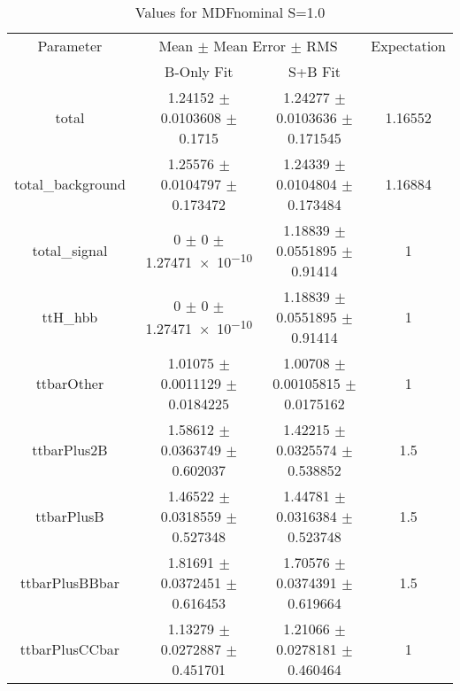 \begin{table}
\centering
\caption{Values for MDFnominal S=1.0}
\begin{tabular}{cccc}
\toprule
Parameter & \multicolumn{2}{c}{Mean $\pm$ Mean Error $\pm$ RMS} & Expectation\\
 & B-Only Fit & S+B Fit & \\
\midrule
total & \num{1.24152} $\pm$ \num{0.0103608} $\pm$ \num{0.1715} & \num{1.24277} $\pm$ \num{0.0103636} $\pm$ \num{0.171545} & \num{1.16552}\\
total\_background & \num{1.25576} $\pm$ \num{0.0104797} $\pm$ \num{0.173472} & \num{1.24339} $\pm$ \num{0.0104804} $\pm$ \num{0.173484} & \num{1.16884}\\
total\_signal & \num{0} $\pm$ \num{0} $\pm$ \num{1.27471e-10} & \num{1.18839} $\pm$ \num{0.0551895} $\pm$ \num{0.91414} & \num{1}\\
ttH\_hbb & \num{0} $\pm$ \num{0} $\pm$ \num{1.27471e-10} & \num{1.18839} $\pm$ \num{0.0551895} $\pm$ \num{0.91414} & \num{1}\\
ttbarOther & \num{1.01075} $\pm$ \num{0.0011129} $\pm$ \num{0.0184225} & \num{1.00708} $\pm$ \num{0.00105815} $\pm$ \num{0.0175162} & \num{1}\\
ttbarPlus2B & \num{1.58612} $\pm$ \num{0.0363749} $\pm$ \num{0.602037} & \num{1.42215} $\pm$ \num{0.0325574} $\pm$ \num{0.538852} & \num{1.5}\\
ttbarPlusB & \num{1.46522} $\pm$ \num{0.0318559} $\pm$ \num{0.527348} & \num{1.44781} $\pm$ \num{0.0316384} $\pm$ \num{0.523748} & \num{1.5}\\
ttbarPlusBBbar & \num{1.81691} $\pm$ \num{0.0372451} $\pm$ \num{0.616453} & \num{1.70576} $\pm$ \num{0.0374391} $\pm$ \num{0.619664} & \num{1.5}\\
ttbarPlusCCbar & \num{1.13279} $\pm$ \num{0.0272887} $\pm$ \num{0.451701} & \num{1.21066} $\pm$ \num{0.0278181} $\pm$ \num{0.460464} & \num{1}\\
\bottomrule
\end{tabular}
\end{table}